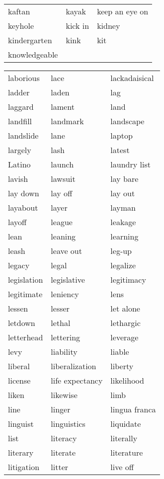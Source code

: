 \documentclass{minimal}
\begin{document}
\begin{longtable}{p{2.7cm}@{\hskip 0.2cm}p{2.7cm}@{\hskip 0.2cm}p{2.7cm}}
kaftan & kayak & keep an eye on \\
keyhole & kick in & kidney \\
kindergarten & kink & kit \\
knowledgeable
\end{longtable}

\begin{longtable}{p{2.7cm}@{\hskip 0.2cm}p{2.7cm}@{\hskip 0.2cm}p{2.7cm}}
laborious & lace & lackadaisical \\
ladder & laden & lag \\
laggard & lament & land \\
landfill & landmark & landscape \\
landslide & lane & laptop \\
largely & lash & latest \\
Latino & launch & laundry list \\
lavish & lawsuit & lay bare \\
lay down & lay off & lay out \\
layabout & layer & layman \\
layoff & league & leakage \\
lean & leaning & learning \\
leash & leave out & leg-up \\
legacy & legal & legalize \\
legislation & legislative & legitimacy \\
legitimate & leniency & lens \\
lessen & lesser & let alone \\
letdown & lethal & lethargic \\
letterhead & lettering & leverage \\
levy & liability & liable \\
liberal & liberalization & liberty \\
license & life expectancy & likelihood \\
liken & likewise & limb \\
line & linger & lingua franca \\
linguist & linguistics & liquidate \\
list & literacy & literally \\
literary & literate & literature \\
litigation & litter & live off \\

\end{longtable}
\end{document}
